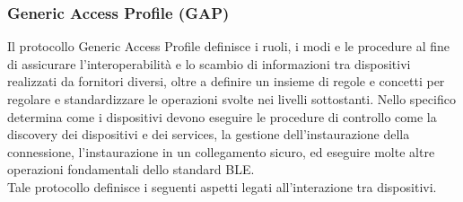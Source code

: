 \subsubsection{Generic Access Profile (GAP)}
Il protocollo Generic Access Profile definisce i ruoli, i modi e le procedure al fine di assicurare l'interoperabilità e lo scambio di informazioni tra dispositivi realizzati da fornitori diversi, oltre a definire un insieme di regole e concetti per regolare e standardizzare le operazioni svolte nei livelli sottostanti.
Nello specifico determina come i dispositivi devono eseguire le procedure di controllo come la discovery dei dispositivi e dei services, la gestione dell'instaurazione della connessione, l'instaurazione in un collegamento sicuro, ed eseguire molte altre operazioni fondamentali dello standard BLE.\\

\noindent Tale protocollo definisce i seguenti aspetti legati all'interazione tra dispositivi.
